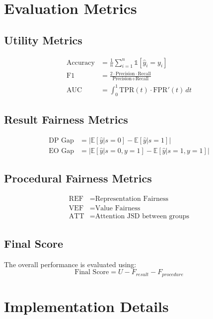 \documentclass[11pt]{article}
\begin{document}
\section{Evaluation Metrics}

\subsection{Utility Metrics}
\begin{align}
    \text{Accuracy} &= \frac{1}{n} \sum_{i=1}^n \mathbb{1}[\hat{y}_i = y_i] \\
    \text{F1} &= \frac{2 \cdot \text{Precision} \cdot \text{Recall}}{\text{Precision} + \text{Recall}} \\
    \text{AUC} &= \int_0^1 \text{TPR}(t) \cdot \text{FPR}'(t) \, dt
\end{align}

\subsection{Result Fairness Metrics}
\begin{align}
    \text{DP Gap} &= \left| \mathbb{E}[\hat{y}|s=0] - \mathbb{E}[\hat{y}|s=1] \right| \\
    \text{EO Gap} &= \left| \mathbb{E}[\hat{y}|s=0, y=1] - \mathbb{E}[\hat{y}|s=1, y=1] \right|
\end{align}

\subsection{Procedural Fairness Metrics}
\begin{align}
    \text{REF} &= \text{Representation Fairness} \\
    \text{VEF} &= \text{Value Fairness} \\
    \text{ATT} &= \text{Attention JSD between groups}
\end{align}

\subsection{Final Score}
The overall performance is evaluated using:
\begin{equation}
    \text{Final Score} = U - F_{result} - F_{procedure}
\end{equation}

\section{Implementation Details}
\end{document}
